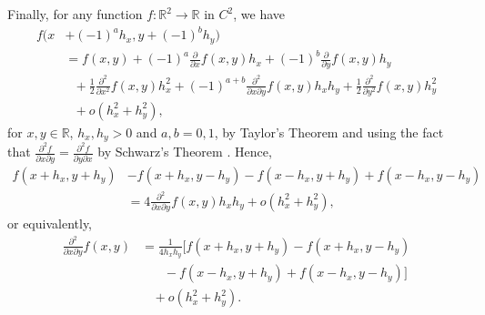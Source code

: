 \documentclass[english]{article}
\numberwithin{equation}{section}
\numberwithin{figure}{section}
\theoremstyle{bolddescit}
\theoremstyle{definition}
\theoremstyle{definition}
\theoremstyle{plain}
\theoremstyle{plain}
\theoremstyle{bolddesc}
\theoremstyle{plain}
\theoremstyle{remark}
\begin{document}
Finally, for any function $f : \mathbb{R}^2 \to \mathbb{R}$ in $C^2$, we have
\begin{align*}
  f(x&+ (-1)^a h_x, y + (-1)^b h_y)\\
  &= f(x,y) + (-1)^a \frac{\partial}{\partial x} f(x,y) h_x + (-1)^b \frac{\partial}{\partial y} f(x,y) h_y\\
  &\ \ \ + \frac{1}{2} \frac{\partial^2}{\partial x^2} f(x,y) h_x^2 + (-1)^{a+b} \frac{\partial^2}{\partial x \partial y} f(x,y) h_x h_y + \frac{1}{2} \frac{\partial^2}{\partial y^2} f(x,y) h_y^2\\
  &\ \ \ + o(h_x^2 + h_y^2),
\end{align*}
for $x,y \in \mathbb{R}$, $h_x, h_y > 0$ and $a,b=0,1$, by Taylor's Theorem and using the fact that $\frac{\partial^2 f}{\partial x \partial y} = \frac{\partial^2 f}{\partial y \partial x}$ by Schwarz's Theorem . Hence,
\begin{align*}
  f(x+h_x,y+h_y) &- f(x+h_x,y-h_y) - f(x-h_x,y+h_y) + f(x-h_x,y-h_y)\\
  &= 4 \frac{\partial^2}{\partial x \partial y} f(x,y) h_x h_y + o(h_x^2 + h_y^2),
\end{align*}
or equivalently,
\begin{align*}
  \frac{\partial^2}{\partial x \partial y} f(x,y)
  &= \frac{1}{4 h_x h_y} [f(x+h_x,y+h_y) - f(x+h_x,y-h_y)\\
  &\ \ \ \ \ \ \ \ - f(x-h_x,y+h_y) + f(x-h_x,y-h_y)]\\
  &\ \ \ \ + o(h_x^2 + h_y^2).
\end{align*}
\end{document}
